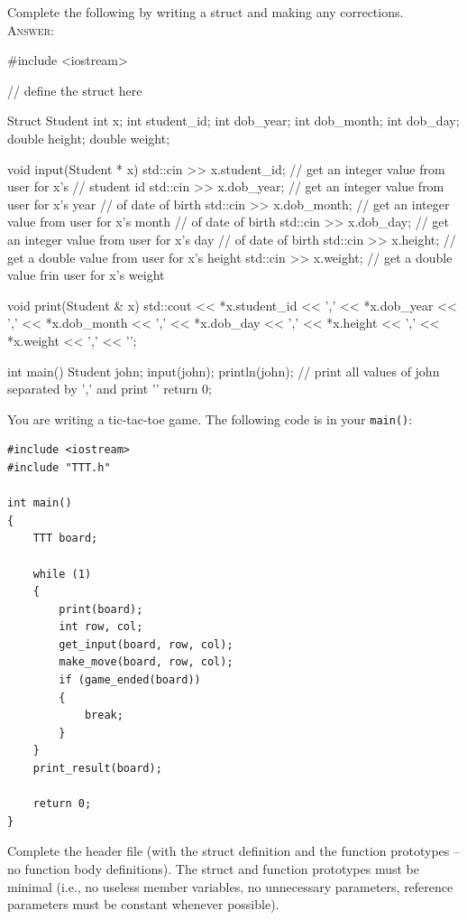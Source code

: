 \newpage
\nextq
Complete the following by writing a struct and making any corrections.
\\
\textsc{Answer:}\vspace{-2mm}
\begin{answercode}
#include <iostream>

// define the struct here

Struct Student
{
  int x;
  int student_id;
  int dob_year;
  int dob_month;
  int dob_day;
  double height;
  double weight;
}

void input(Student * x)
{
    std::cin >> x.student_id; // get an integer value from user for x's 
                              // student id
    std::cin >> x.dob_year;   // get an integer value from user for x's year 
                              // of date of birth
    std::cin >> x.dob_month;  // get an integer value from user for x's month 
                              // of date of birth
    std::cin >> x.dob_day;    // get an integer value from user for x's day 
                              // of date of birth
    std::cin >> x.height;     // get a double value from user for x's height
    std::cin >> x.weight;     // get a double value frin user for x's weight
}

void print(Student & x)
{
  std::cout << *x.student_id << ','
            << *x.dob_year << ','
            << *x.dob_month << ','
            << *x.dob_day << ','
            << *x.height << ','
            << *x.weight << ','
            << '\n';
}

int main()
{
    Student john;
    input(john);
    println(john); // print all values of john separated by ',' and print '\n'
    return 0;
}
\end{answercode}

\newpage
\nextq
You are writing a tic-tac-toe game. The following code is in your
\verb!main()!:
\vspace{-3mm}
\begin{Verbatim}[frame=single,fontsize=\small]
#include <iostream>
#include "TTT.h"

int main()
{
    TTT board;

    while (1)
    {
        print(board);
        int row, col;
        get_input(board, row, col);
        make_move(board, row, col);
        if (game_ended(board)) 
        {
            break;
        }
    }
    print_result(board);

    return 0;
}
\end{Verbatim}
\vspace{-4mm}
Complete the header file (with the struct definition and the function
prototypes -- no function body definitions).
The struct and function prototypes must be minimal
(i.e., no useless member variables, no unnecessary parameters,
reference parameters must be constant whenever possible).

